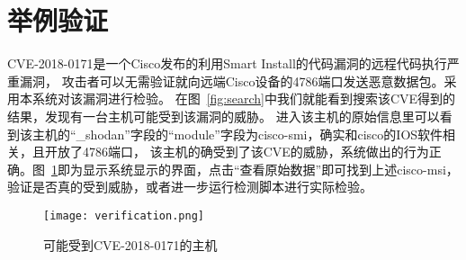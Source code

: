 \section{举例验证}
\label{sec:verification}

CVE-2018-0171是一个Cisco发布的利用Smart Install的代码漏洞的远程代码执行严重漏洞，
攻击者可以无需验证就向远端Cisco设备的4786端口发送恶意数据包。采用本系统对该漏洞进行检验。
在图~\ref{fig:search}中我们就能看到搜索该CVE得到的结果，发现有一台主机可能受到该漏洞的威胁。
进入该主机的原始信息里可以看到该主机的“\_shodan”字段的“module”字段为cisco-smi，确实和cisco的IOS软件相关，且开放了4786端口，
该主机的确受到了该CVE的威胁，系统做出的行为正确。图~\ref{fig:verification}即为显示系统显示的界面，点击“查看原始数据”即可找到上述cisco-msi，
验证是否真的受到威胁，或者进一步运行检测脚本进行实际检验。

\begin{figure}[H]
    \centering
    \texttt{[image: verification.png]}
    \caption{可能受到CVE-2018-0171的主机}
    \label{fig:verification}
\end{figure}
